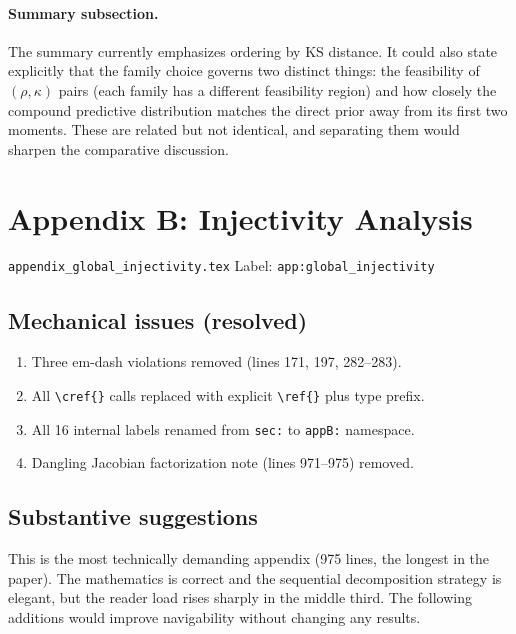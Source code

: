 \documentclass[11pt,a4paper]{article}
\begin{document}
\paragraph{Summary subsection.}
The summary currently emphasizes ordering by KS distance. It could also
state explicitly that the family choice governs two distinct things: the
feasibility of $(\rho, \kappa)$ pairs (each family has a different
feasibility region) and how closely the compound predictive distribution
matches the direct prior away from its first two moments. These are
related but not identical, and separating them would sharpen the
comparative discussion.


\section{Appendix B: Injectivity Analysis}

\texttt{appendix\_global\_injectivity.tex} \hfill Label:
\texttt{app:global\_injectivity}

\subsection{Mechanical issues (resolved)}

\begin{enumerate}[label=\arabic*.]
  \item Three em-dash violations removed (lines 171, 197, 282--283).
  \item All \texttt{\textbackslash cref\{\}} calls replaced with
    explicit \texttt{\textbackslash ref\{\}} plus type prefix.
  \item All 16 internal labels renamed from \texttt{sec:} to
    \texttt{appB:} namespace.
  \item Dangling Jacobian factorization note (lines 971--975) removed.
\end{enumerate}

\subsection{Substantive suggestions}

This is the most technically demanding appendix (975 lines, the longest
in the paper). The mathematics is correct and the sequential
decomposition strategy is elegant, but the reader load rises sharply in
the middle third. The following additions would improve navigability
without changing any results.
\end{document}
